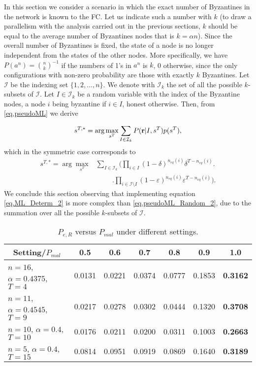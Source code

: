 \documentclass[10pt,peerreview,draftcls,onecolumn]{IEEEtran}
\begin{document}
In this section we consider a scenario in which the exact number of Byzantines in the network is known to the FC. Let us indicate such a number with $k$ (to draw a parallelism with the analysis carried out in the previous sections, $k$ should be equal to the average number of Byzantines nodes that is $k = \alpha n$). Since the overall number of Byzantines is fixed, the state of a node is no longer independent from the states of the other nodes. More specifically, we have $P(a^n) = {\binom{n}{k}}^{-1}$ if the numbers of 1's in  $a^n$ is $k$, 0 otherwise, since the only configurations with non-zero probability are those with exactly $k$ Byzantines.
Let $\mathcal{I}$ be the indexing set $\{1,2,...,n\}$.  We denote with $\mathcal{I}_k$ the set of all the possible $k$-subsets of $\mathcal{I}$. Let $I \in \mathcal{I}_k$ be a random variable with the index of the Byzantine nodes, a node $i$ being byzantine if $i \in I$, honest otherwise.
Then, from \eqref{eq.pseudoML} we derive

\begin{align}
s^{T,*} = \arg\max_{s^T}  \sum_{I \in \mathcal{I}_{k}} P({\bf r} | I, s^T ) p(s^T),\label{eq.ML_Determ}
\end{align}
which in the symmetric case corresponds to
\begin{align}
s^{T,*} =  \arg\max_{s^T} & \sum_{I \in \mathcal{I}_{k}} \bigg(\prod_{i \in I} (1-\delta)^{n_{eq}(i)} \delta^{T-n_{eq}(i)}\bigg.\nonumber\\
  & \hspace{1cm} \bigg.\prod_{i \in \mathcal{I} \setminus I} (1-\varepsilon)^{n_{eq}(i)} \varepsilon^{T-n_{eq}(i)}\bigg).
  \label{eq.ML_Determ_2}
\end{align}
We conclude this section observing that implementing equation \eqref{eq.ML_Determ_2} is more complex than \eqref{eq.pseudoML_Random_2}, due to the summation over all the possible $k$-subsets of $\mathcal{I}$.

\begin{table*}[t!]
\small
\centering
\renewcommand{\arraystretch}{1.1}
\begin{tabular}{c| c c c c c c|}
\hline
\multicolumn{1}{|c|}{Setting/$P_{mal}$} & 0.5   & 0.6   & 0.7   & 0.8   &0.9   &1.0   \\ \hline
\multicolumn{1}{|l|}{$n=16$, $\alpha=0.4375$, $T=4$}  &0.0131 &0.0221 &0.0374	&0.0777	&0.1853 &{\bf 0.3162}\\ \hline
\multicolumn{1}{|l|}{$n=11$, $\alpha=0.4545$, $T=9$} &0.0217 &0.0278 &0.0302	&0.0444	&0.1320 &{\bf 0.3708}\\ \hline
\multicolumn{1}{|l|}{$n=10$, $\alpha=0.4$, $T=10$}  & 0.0176 &0.0211 &0.0200 &0.0311 &0.1003 &{\bf 0.2663}\\ \hline
\multicolumn{1}{|l|}{$n=5$, $\alpha=0.4$, $T=15$} &0.0814 &0.0951 &0.0919 &0.0869 &0.1640 &{\bf 0.3189}\\\hline
\end{tabular}

\caption{$P_{e,R}$ versus $P_{mal}$ under different settings.}
\label{tab.ProbTable}
\end{table*}
\end{document}
